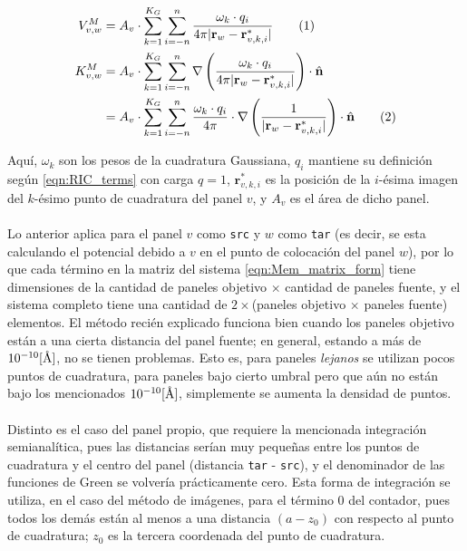 \documentclass[12pt, oneside, numbers, spanish]{ezthesis}
\newcommand\numberthis{\addtocounter{equation}{1}\tag{\theequation}}
\numberwithin{equation}{section}
\newcommand{\angstrom}{\text{\normalfont\AA}}
\begin{document}
\begin{align*}
V_{v,w}^M &= A_v\cdot\sum_{k=1}^{K_G}\sum_{i=-n}^{n}\frac{\omega_k\cdot q_i}{4\pi|\mathbf{r}_w - \mathbf{r}_{v,k,i}^*|} \numberthis\\
K_{v,w}^M &= A_v\cdot\sum_{k=1}^{K_G}\sum_{i=-n}^{n}\nabla\left(\frac{\omega_k\cdot q_i}{4\pi|\mathbf{r}_w - \mathbf{r}_{v,k,i}^*|}\right)\cdot\hat{\mathbf{n}} \\
&= A_v\cdot\sum_{k=1}^{K_G}\sum_{i=-n}^{n}\frac{\omega_k\cdot q_i}{4\pi}\cdot\nabla\left(\frac{1}{|\mathbf{r}_w - \mathbf{r}_{v,k,i}^*|}\right)\cdot\hat{\mathbf{n}}\numberthis
\end{align*}


\noindent
Aquí, $\omega_k$ son los pesos de la cuadratura Gaussiana, $q_i$ mantiene su definición según \ref{eqn:RIC_terms} con carga $q = 1$, $\mathbf{r}_{v,k,i}^*$ es la posición de la $i$-ésima imagen del $k$-ésimo punto de cuadratura del panel $v$, y $A_v$ es el área de dicho panel.\\\\
Lo anterior aplica para el panel $v$ como \texttt{src} y $w$ como \texttt{tar} (es decir, se esta calculando el potencial debido a $v$ en el punto de colocación del panel $w$), por lo que cada término en la matriz del sistema \ref{eqn:Mem_matrix_form} tiene dimensiones de la cantidad de paneles objetivo $\times$ cantidad de paneles fuente, y el sistema completo tiene una cantidad de $2\times$(paneles objetivo $\times$ paneles fuente) elementos. El método recién explicado funciona bien cuando los paneles objetivo están a una cierta distancia del panel fuente; en general, estando a más de $10^{-10} [\angstrom]$, no se tienen problemas. Esto es, para paneles \textit{lejanos} se utilizan pocos puntos de cuadratura, para paneles bajo cierto umbral pero que aún no están bajo los mencionados $10^{-10} [\angstrom]$, simplemente se aumenta la densidad de puntos.\\\\
Distinto es el caso del panel propio, que requiere la mencionada integración semianalítica, pues las distancias serían muy pequeñas entre los puntos de cuadratura y el centro del panel (distancia \texttt{tar} - \texttt{src}), y el denominador de las funciones de Green se volvería prácticamente cero. Esta forma de integración se utiliza, en el caso del método de imágenes, para el término 0 del contador, pues todos los demás están al menos a una distancia $(a - z_0)$ con respecto al punto de cuadratura; $z_0$ es la tercera coordenada del punto de cuadratura.\\\\
\end{document}
